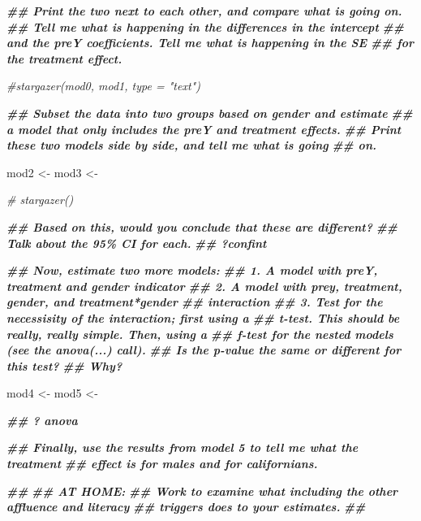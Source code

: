 \documentclass[
]{article}
\newenvironment{Shaded}{\begin{snugshade}}{\end{snugshade}}
\newcommand{\CommentTok}[1]{\textcolor[rgb]{0.56,0.35,0.01}{\textit{#1}}}
\newcommand{\DocumentationTok}[1]{\textcolor[rgb]{0.56,0.35,0.01}{\textbf{\textit{#1}}}}
\newcommand{\NormalTok}[1]{#1}
\newcommand{\OtherTok}[1]{\textcolor[rgb]{0.56,0.35,0.01}{#1}}
\newcommand{\StringTok}[1]{\textcolor[rgb]{0.31,0.60,0.02}{#1}}
\begin{document}
\begin{Shaded}
\begin{Highlighting}[]
\DocumentationTok{\#\# Print the two next to each other, and compare what is going on.}
\DocumentationTok{\#\# Tell me what is happening in the differences in the intercept}
\DocumentationTok{\#\# and the preY coefficients. Tell me what is happening in the SE}
\DocumentationTok{\#\# for the treatment effect. }

\CommentTok{\#stargazer(mod0, mod1, type = "text")}

\DocumentationTok{\#\# Subset the data into two groups based on gender and estimate}
\DocumentationTok{\#\# a model that only includes the preY and treatment effects.}
\DocumentationTok{\#\# Print these two models side by side, and tell me what is going}
\DocumentationTok{\#\# on.}

\NormalTok{mod2 }\OtherTok{\textless{}{-}} \StringTok{\textquotesingle{}\textquotesingle{}}
\NormalTok{mod3 }\OtherTok{\textless{}{-}} \StringTok{\textquotesingle{}\textquotesingle{}}

\CommentTok{\# stargazer() }

\DocumentationTok{\#\# Based on this, would you conclude that these are different?}
\DocumentationTok{\#\# Talk about the 95\% CI for each.}
\DocumentationTok{\#\# ?confint}

\DocumentationTok{\#\# Now, estimate two more models:}
\DocumentationTok{\#\#  1. A model with preY, treatment and gender indicator}
\DocumentationTok{\#\#  2. A model with prey, treatment, gender, and treatment*gender}
\DocumentationTok{\#\#     interaction}
\DocumentationTok{\#\#  3. Test for the necessisity of the interaction; first using a}
\DocumentationTok{\#\#     t{-}test. This should be really, really simple. Then, using a}
\DocumentationTok{\#\#     f{-}test for the nested models (see the anova(...) call).}
\DocumentationTok{\#\#     Is the p{-}value the same or different for this test?}
\DocumentationTok{\#\#     Why? }

\NormalTok{mod4 }\OtherTok{\textless{}{-}} \StringTok{\textquotesingle{}\textquotesingle{}}
\NormalTok{mod5 }\OtherTok{\textless{}{-}} \StringTok{\textquotesingle{}\textquotesingle{}}

\DocumentationTok{\#\# ? anova}

\DocumentationTok{\#\# Finally, use the results from model 5 to tell me what the treatment}
\DocumentationTok{\#\# effect is for males and for californians.}


\DocumentationTok{\#\# }
\DocumentationTok{\#\# AT HOME:}
\DocumentationTok{\#\# Work to examine what including the other affluence and literacy}
\DocumentationTok{\#\# triggers does to your estimates.}
\DocumentationTok{\#\#}
\end{Highlighting}
\end{Shaded}
\end{document}
